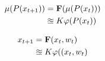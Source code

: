 \documentclass[10pt]{article}
\begin{document}
\begin{equation*}
\begin{aligned}
\mu(P(x_{t+1})) &= {\bf F}(\mu(P(x_{t}))) \\ & \approxeq K\varphi(P(x_t)) 
\end{aligned}
\end{equation*}

\bigskip
\begin{equation*}
\begin{aligned}
x_{t+1} &= {\bf F}(x_{t},w_t) \\ & \approxeq K\varphi((x_t,w_t) 
\end{aligned}
\end{equation*}
\end{document}

